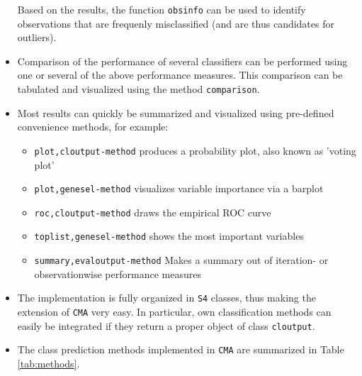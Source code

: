 \begin{itemize}
      Based on the results, the function \texttt{obsinfo} can be used to
      identify observations that are frequenly misclassified (and are thus
      candidates for outliers).
\item Comparison of the performance of several classifiers can be performed
	using one or several of the above performance measures. This comparison 
	can be tabulated and visualized using the method \texttt{comparison}.
\item Most results can quickly be summarized and visualized using pre-defined convenience
      methods, for example:
      \begin{itemize}
      \item \texttt{plot,cloutput-method} produces a probability plot,             also known as 'voting plot'
      \item \texttt{plot,genesel-method} visualizes variable importance via a barplot
      \item \texttt{roc,cloutput-method} draws the empirical ROC curve
      \item \texttt{toplist,genesel-method} shows the most important variables
      \item \texttt{summary,evaloutput-method} Makes a summary out of
        iteration- or observationwise performance measures 
      \end{itemize}
\item The implementation is fully organized in \texttt{S4} classes, thus making
      the extension of \texttt{CMA} very easy. In particular, own classification
      methods can easily be integrated if they return a proper object of class
     \texttt{cloutput}.
\item The class prediction methods implemented in \texttt{CMA} are summarized in Table
\ref{tab:methods}.                       
\end{itemize}

